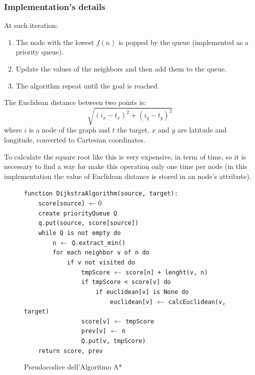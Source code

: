 \documentclass[a4paper,11pt]{report}
\begin{document}
\subsubsection*{Implementation's details}
At each iteration:
\begin{enumerate}
	\item The node with the lowest $f(n)$ is popped by the queue (implemented as a priority queue).
	\item Update the values of the neighbors and then add them to the queue.
	\item The algorithm repeat until the goal is reached.
\end{enumerate}
The Euclidean distance between two points is: $$\sqrt{(i_x - t_x)^2 + (i_y - t_y)^2}$$
where $i$ is a node of the graph and $t$ the target, $x$ and $y$ are latitude and longitude, converted to Cartesian coordinates.

To calculate the square root like this is very expensive, in term of time, so it is necessary to find a way for make this operation only one time per node (in this implementation the value of Euclidean distance is stored in an node's attribute).

\begin{figure}
	\verb|function DijkstraAlgorithm(source, target):|\\
	\verb|    score[source]| $\leftarrow 0$\\
	\verb|    create priorityQueue Q|\\
	\verb|    q.put(source, score[source])|\\
	\verb|    while Q is not empty do|\\
	\verb|        n| $\leftarrow$ \verb|Q.extract_min()|\\
	\verb|        for each neighbor v of n do|\\
	\verb|            if v not visited do|\\
	\verb|                tmpScore| $\leftarrow$ \verb|score[n] + lenght(v, n)|\\
	\verb|                if tmpScore < score[v] do|\\
	\verb|                    if euclidean[v] is None do|\\
	\verb|                        euclidean[v]| $\leftarrow$ \verb|calcEuclidean(v, target)|\\
	\verb|                score[v]| $\leftarrow$ \verb|tmpScore|\\
	\verb|                prev[v]| $\leftarrow$ \verb|n|\\
	\verb|                Q.put(v, tmpScore)|\\
	\verb|    return score, prev|\\
	\caption{Pseudocodice dell'Algoritmo A*}
	\label{fig:Astar}
\end{figure}
\end{document}
